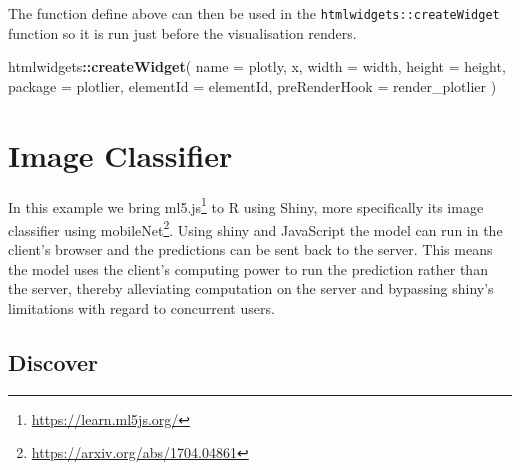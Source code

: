 \documentclass[
]{krantz}
\makeatletter
\newenvironment{Shaded}{\begin{snugshade}}{\end{snugshade}}
\newcommand{\ControlFlowTok}[1]{\textcolor[rgb]{0.27,0.27,0.27}{\textbf{#1}}}
\newcommand{\DataTypeTok}[1]{\textcolor[rgb]{0.27,0.27,0.27}{#1}}
\newcommand{\KeywordTok}[1]{\textcolor[rgb]{0.27,0.27,0.27}{\textbf{#1}}}
\newcommand{\NormalTok}[1]{#1}
\newcommand{\OperatorTok}[1]{\textcolor[rgb]{0.43,0.43,0.43}{\textbf{#1}}}
\newcommand{\OtherTok}[1]{\textcolor[rgb]{0.37,0.37,0.37}{#1}}
\newcommand{\StringTok}[1]{\textcolor[rgb]{0.5,0.5,0.5}{#1}}
\renewcommand{\href}[2]{#2\footnote{\url{#1}}}
\newenvironment{kframe}{%
\medskip{}
\setlength{\fboxsep}{.8em}
 \def\at@end@of@kframe{}%
 \ifinner\ifhmode%
  \def\at@end@of@kframe{\end{minipage}}%
  \begin{minipage}{\columnwidth}%
 \fi\fi%
 \def\FrameCommand##1{\hskip\@totalleftmargin \hskip-\fboxsep
 \colorbox{shadecolor}{##1}\hskip-\fboxsep
     \hskip-\linewidth \hskip-\@totalleftmargin \hskip\columnwidth}%
 \MakeFramed {\advance\hsize-\width
   \@totalleftmargin\z@ \linewidth\hsize
   \@setminipage}}%
 {\par\unskip\endMakeFramed%
 \at@end@of@kframe}
\renewenvironment{Shaded}{\begin{kframe}}{\end{kframe}}
\makeatother
\begin{document}
\begin{Shaded}
\end{Shaded}

The function define above can then be used in the \texttt{htmlwidgets::createWidget} function so it is run just before the visualisation renders.

\begin{Shaded}
\begin{Highlighting}[]
\NormalTok{htmlwidgets}\OperatorTok{::}\KeywordTok{createWidget}\NormalTok{(}
  \DataTypeTok{name =} \StringTok{\textquotesingle{}plotly\textquotesingle{}}\NormalTok{,}
\NormalTok{  x,}
  \DataTypeTok{width =}\NormalTok{ width,}
  \DataTypeTok{height =}\NormalTok{ height,}
  \DataTypeTok{package =} \StringTok{\textquotesingle{}plotlier\textquotesingle{}}\NormalTok{,}
  \DataTypeTok{elementId =}\NormalTok{ elementId,}
  \DataTypeTok{preRenderHook =}\NormalTok{ render\_plotlier}
\NormalTok{)}
\end{Highlighting}
\end{Shaded}

\hypertarget{image-classifier}{%
\chapter{Image Classifier}\label{image-classifier}}

In this example we bring \href{https://learn.ml5js.org/}{ml5.js} to R using Shiny, more specifically its image classifier using \href{https://arxiv.org/abs/1704.04861}{mobileNet}. Using shiny and JavaScript the model can run in the client's browser and the predictions can be sent back to the server. This means the model uses the client's computing power to run the prediction rather than the server, thereby alleviating computation on the server and bypassing shiny's limitations with regard to concurrent users.

\hypertarget{discover-1}{%
\section*{Discover}\label{discover-1}}
\end{document}
